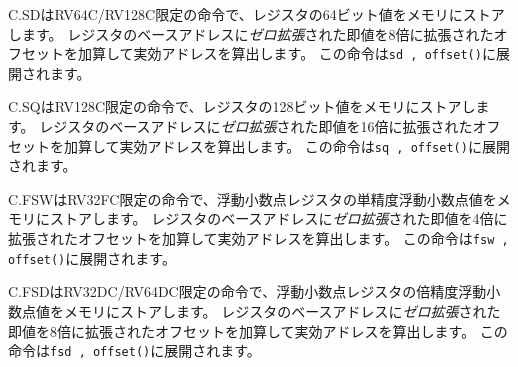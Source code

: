 \begin{comment}
C.SD is an RV64C/RV128C-only instruction that stores a 64-bit value in
register {\em \rstwoprime} to memory.  It computes an effective address by adding
the {\em zero}-extended offset, scaled by 8, to the base address in register
{\em \rsoneprime}.
It expands to {\tt sd \rstwoprime, offset(\rsoneprime)}.
\end{comment}
C.SDはRV64C/RV128C限定の命令で、レジスタ{\em \rstwoprime}の64ビット値をメモリにストアします。
レジスタのベースアドレス{\em \rsoneprime}に{\em ゼロ拡張}された即値を8倍に拡張されたオフセットを加算して実効アドレスを算出します。
この命令は{\tt sd \rstwoprime, offset(\rsoneprime)}に展開されます。

\begin{comment}
C.SQ is an RV128C-only instruction that stores a 128-bit value in register
{\em \rstwoprime} to memory.  It computes an effective address by adding the {\em
zero}-extended offset, scaled by 16, to the base address in register {\em
\rsoneprime}.
It expands to {\tt sq \rstwoprime, offset(\rsoneprime)}.
\end{comment}
C.SQはRV128C限定の命令で、レジスタ{\em \rstwoprime}の128ビット値をメモリにストアします。
レジスタのベースアドレス{\em \rsoneprime}に{\em ゼロ拡張}された即値を16倍に拡張されたオフセットを加算して実効アドレスを算出します。
この命令は{\tt sq \rstwoprime, offset(\rsoneprime)}に展開されます。

\begin{comment}
C.FSW is an RV32FC-only instruction that stores a single-precision
floating-point value in floating-point register {\em \rstwoprime} to memory.  It
computes an effective address by adding the {\em zero}-extended offset, scaled
by 4, to the base address in register {\em \rsoneprime}.  It expands to {\tt fsw
\rstwoprime, offset(\rsoneprime)}.
\end{comment}
C.FSWはRV32FC限定の命令で、浮動小数点レジスタ{\em \rstwoprime}の単精度浮動小数点値をメモリにストアします。
レジスタのベースアドレス{\em \rsoneprime}に{\em ゼロ拡張}された即値を4倍に拡張されたオフセットを加算して実効アドレスを算出します。
この命令は{\tt fsw \rstwoprime, offset(\rsoneprime)}に展開されます。

\begin{comment}
C.FSD is an RV32DC/RV64DC-only instruction that stores a double-precision
floating-point value in floating-point register {\em \rstwoprime} to memory.  It
computes an effective address by adding the {\em zero}-extended offset, scaled
by 8, to the base address in register {\em \rsoneprime}.  It expands to {\tt fsd
\rstwoprime, offset(\rsoneprime)}.
\end{comment}
C.FSDはRV32DC/RV64DC限定の命令で、浮動小数点レジスタ{\em \rstwoprime}の倍精度浮動小数点値をメモリにストアします。
レジスタのベースアドレス{\em \rsoneprime}に{\em ゼロ拡張}された即値を8倍に拡張されたオフセットを加算して実効アドレスを算出します。
この命令は{\tt fsd \rstwoprime, offset(\rsoneprime)}に展開されます。

